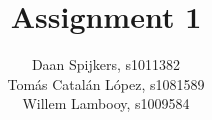 \documentclass{scrartcl}
\title{Assignment 1}
\author{Daan Spijkers, s1011382\\ Tomás Catalán López, s1081589\\ Willem Lambooy, s1009584}
\begin{document}
\maketitle

\begin{enumerate}

    

\end{enumerate}
\end{document}
